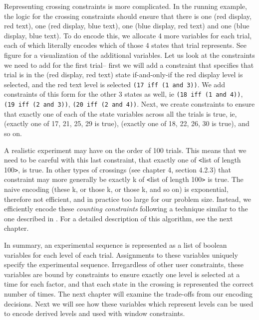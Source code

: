 Representing crossing constraints is more complicated. In the running example, the logic for the crossing constraints should ensure that there is one (red display, red text), one (red display, blue text), one (blue display, red text) and one (blue display, blue text). To do encode this, we allocate 4 more variables for each trial, each of which literally encodes which of those 4 states that trial represents. See figure  for a visualization of the additional variables. Let us look at the constraints we need to add for the first trial-- first we will add a constraint that specifies that trial is in the (red display, red text) state if-and-only-if the red display level is selected, and the red text level is selected \texttt{(17 iff (1 and 3))}. We add constraints of this form for the other 3 states as well, ie \texttt{(18 iff (1 and 4))}, \texttt{(19 iff (2 and 3))}, \texttt{(20 iff (2 and 4))}. Next, we create constraints to ensure that exactly one of each of the state variables across all the trials is true, ie, (exactly one of 17, 21, 25, 29 is true), (exactly one of 18, 22, 26, 30 is true), and so on.

A realistic experiment may have on the order of 100 trials. This means that we need to be careful with this last constraint, that exactly one of \texttt{<}list of length 100\texttt{>}, is true. In other types of crossings (see chapter 4, section 4.2.3) that constraint may more generally be exactly k of \texttt{<}list of length 100\texttt{>} is true. The naive encoding (these k, or those k, or those k, and so on) is exponential, therefore not efficient, and in practice too large for our problem size. Instead, we efficiently encode these \emph{counting constraints} following a technique similar to the one described in \cite{sinz2005towards}. For a detailed description of this algorithm, see the next chapter.

In summary, an experimental sequence is represented as a list of boolean variables for each level of each trial. Assignments to these variables uniquely specify the experimental sequence. Irregardless of other user constraints, these variables are bound by constraints to ensure exactly one level is selected at a time for each factor, and that each state in the crossing is represented the correct number of times. The next chapter will examine the trade-offs from our encoding decisions. Next we will see how these variables which represent levels can be used to encode derived levels and used with window constraints.


